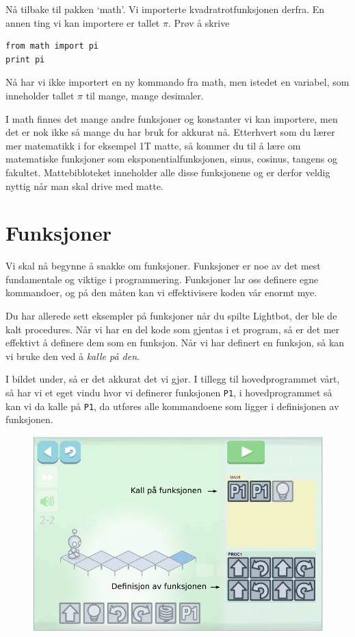 \documentclass[a4paper, 11pt, notitlepage]{article}
\begin{document}
Nå tilbake til pakken `math'. Vi importerte kvadratrotfunksjonen derfra. En annen ting vi kan importere er tallet $\pi$. Prøv å skrive
\begin{lstlisting}
from math import pi 
print pi
\end{lstlisting}
Nå har vi ikke importert en ny kommando fra math, men istedet en variabel, som inneholder tallet $\pi$ til mange, mange desimaler.

I math finnes det mange andre funksjoner og konstanter vi kan importere, men det er nok ikke så mange du har bruk for akkurat nå. Etterhvert som du lærer mer matematikk i for eksempel 1T matte, så kommer du til å lære om matematiske funksjoner som eksponentialfunksjonen, sinus, cosinus, tangens og fakultet. Mattebibloteket inneholder alle disse funksjonene og er derfor veldig nyttig når man skal drive med matte.

\section*{Funksjoner}

Vi skal nå begynne å snakke om funksjoner. Funksjoner er noe av det mest fundamentale og viktige i programmering. Funksjoner lar oss definere egne kommandoer, og på den måten kan vi effektivisere koden vår enormt mye.

Du har allerede sett eksempler på funksjoner når du spilte Lightbot, der ble de kalt procedures. Når vi har en del kode som gjentas i et program, så er det mer effektivt å definere dem som en funksjon. Når vi har definert en funksjon, så kan vi bruke den ved å \emph{kalle på den}. 

I bildet under, så er det akkurat det vi gjør. I tillegg til hovedprogrammet vårt, så har vi et eget vindu hvor vi definerer funksjonen \verb+P1+, i hovedprogrammet så kan vi da kalle på \verb+P1+, da utføres alle kommandoene som ligger i definisjonen av funksjonen.

\begin{figure}[h!]
\centering
\includegraphics[width=\textwidth]{fig/func2}
\end{figure}
\end{document}
